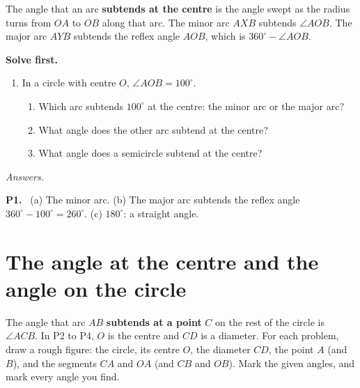 \documentclass[11pt,a4paper]{article}
\theoremstyle{branddef}
\newcounter{prob}
\newenvironment{solvefirst}
  {\par\smallskip\noindent\textbf{Solve first.}
   \begin{enumerate}[label=\textbf{P\arabic*.},leftmargin=2.2em,itemsep=3pt,start=\numexpr\value{prob}+1\relax]}
  {\setcounter{prob}{\value{enumi}}\end{enumerate}}
\newenvironment{answerblock}
  {\par\smallskip\Needspace{10\baselineskip}\begingroup\small\linespread{1.15}\selectfont\color{muted}\noindent\textit{Answers.}\par}
  {\par\endgroup\medskip}
\newcommand{\ans}[1]{\par\smallskip\Needspace{9\baselineskip}\noindent\textbf{#1}\ }
\begin{document}
The angle that an arc \textbf{subtends at the centre} is the angle swept as the radius turns from $OA$ to $OB$ along that arc. The minor arc $AXB$ subtends $\angle AOB$. The major arc $AYB$ subtends the reflex angle $AOB$, which is $360^\circ-\angle AOB$.

\begin{solvefirst}
  \item In a circle with centre $O$, $\angle AOB=100^\circ$.
  \begin{enumerate}[label=(\alph*),itemsep=1pt]
    \item Which arc subtends $100^\circ$ at the centre: the minor arc or the major arc?
    \item What angle does the other arc subtend at the centre?
    \item What angle does a semicircle subtend at the centre?
  \end{enumerate}
\end{solvefirst}

\begin{answerblock}
\ans{P1.}
(a) The minor arc. (b) The major arc subtends the reflex angle $360^\circ-100^\circ=260^\circ$. (c) $180^\circ$: a straight angle.
\end{answerblock}

\section{The angle at the centre and the angle on the circle}

The angle that arc $AB$ \textbf{subtends at a point} $C$ on the rest of the circle is $\angle ACB$. In P2 to P4, $O$ is the centre and $CD$ is a diameter. For each problem, draw a rough figure: the circle, its centre $O$, the diameter $CD$, the point $A$ (and $B$), and the segments $CA$ and $OA$ (and $CB$ and $OB$). Mark the given angles, and mark every angle you find.
\end{document}
